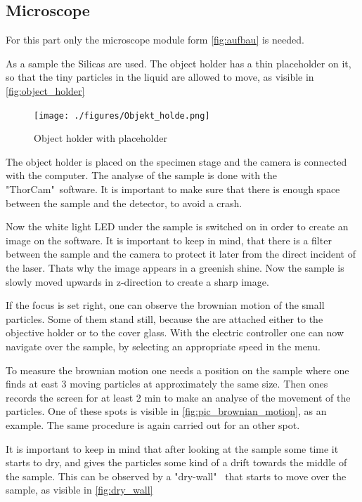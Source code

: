 \documentclass[12pt,english,ngerman]{scrartcl}
\begin{document}
\subsection{Microscope}\label{seq:durchfurung_microscope}

For this part only the microscope module form \autoref{fig:aufbau} is needed.

As a sample the Silicas are used. The object holder has a thin placeholder on it, so that the tiny particles 
in the liquid are allowed to move, as visible in \autoref{fig:object_holder}

\begin{figure}[H]
	\begin{center}
		\texttt{[image: ./figures/Objekt\_holde.png]}
	\end{center}
	\caption[Object holder with placeholder] {
		Object holder with placeholder
	}\label{fig:object_holder}
\end{figure}

The object holder is placed on the specimen stage and the camera is connected with the computer.
The analyse of the sample is done with the "ThorCam"\  software. It is important to make sure that there is enough 
space between the sample and the detector, to avoid a crash.

Now the white light LED under the sample is switched on in order to create an image on the software. 
It is important to keep in mind, that there is a filter between the sample and the camera to protect it later
from the direct incident of the laser. Thats why the image appears in a greenish shine. 
Now the sample is slowly moved upwards in z-direction to create a sharp image.

If the focus is set right, one can observe the brownian motion of the small particles. Some of them stand still,
because the are attached either to the objective holder or to the cover glass. 
With the electric controller one can now navigate over the sample, by selecting an appropriate speed in the menu.

To measure the brownian motion one needs a position on the sample where one finds at east 3 moving particles at 
approximately the same size. Then ones records the screen for at least 2 min to make an analyse of the movement 
of the particles. One of these spots is visible in \autoref{fig:pic_brownian_motion}, as an example.
The same procedure is again carried out for an other spot.


It is important to keep in mind that after looking at the sample some time it starts to dry, and gives the particles 
some kind of a drift towards the middle of the sample. This can be observed by a "dry-wall" \ that starts to move over the 
sample, as visible in \autoref{fig:dry_wall}
\end{document}
